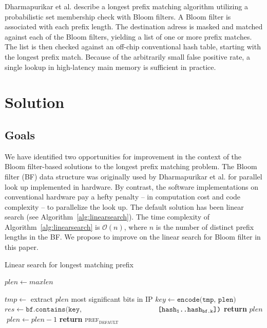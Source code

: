 \documentclass[conference,compsoc]{IEEEtran}
\begin{document}
Dharmapurikar et al.\cite{Dharmapurikar:Bloom} describe a longest prefix
matching algorithm utilizing a probabilistic set membership check with
Bloom filters. A Bloom filter is associated with each prefix length. The
destination adress is masked and matched against each of the Bloom filters,
yielding a list of one or more prefix matches. The list is then checked
against an off-chip conventional hash table, starting with the longest 
prefix match. Because of the arbitrarily small false positive rate, 
a single lookup in high-latency main memory is sufficient in practice.

\section{Solution}

\subsection{Goals}

We have identified two opportunities for improvement in the context of
the Bloom filter-based solutions to the longest prefix matching problem.
The Bloom filter (BF) data structure was originally used by 
Dharmapurikar et al. \cite{Dharmapurikar:Bloom}
for parallel look up implemented in hardware. By contrast, the software
implementations on conventional hardware pay a hefty penalty -- in computation
cost and code complexity -- to parallelize the look up. The default solution
has been linear search (see Algorithm~\ref{alg:linearsearch}). The time
complexity of Algorithm~\ref{alg:linearsearch} is $\mathcal{O}(n)$, where $n$
is the number of distinct prefix lengths in the BF. We
propose to improve on the linear search for Bloom filter in this paper.

\begin{algorithm}
\caption{Linear search for longest matching prefix}\label{alg:linearsearch}
\begin{algorithmic}[1]
\State $plen \gets maxlen$

  \State $tmp \gets$ extract $plen$ most significant bits in IP
  \State $key \gets \texttt{encode(tmp, plen)}$
  \State $res \gets \texttt{bf.contains(key,}$
                \State $\hspace*{36mm} \texttt{[hash\textsubscript{1}..hash\textsubscript{bf.k}])}$
      \State \textbf{return} $plen$
  \Else
    $\;plen \gets plen - 1$
  \EndIf
\EndWhile
\State \textbf{return} \textsc{pref\textsubscript{default}}
\EndProcedure
\end{algorithmic}
\end{algorithm}
\end{document}
